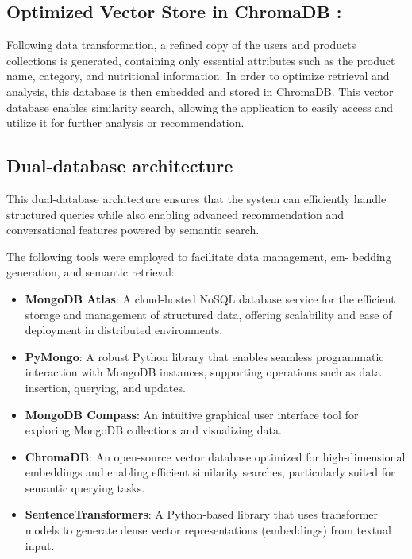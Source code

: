 \subsection{Optimized Vector Store in ChromaDB :}
Following data transformation, a refined copy of the users and products
collections is generated, containing only essential attributes such as
the product name, category, and nutritional information. In order to
optimize retrieval and analysis, this database is then embedded and
stored in ChromaDB. This vector database enables similarity search,
allowing the application to easily access and utilize it for further analysis
or recommendation.


\subsection{Dual-database architecture}
 
This dual-database architecture ensures that the system can efficiently
handle structured queries while also enabling advanced recommendation
and conversational features powered by semantic search.

\par The following tools were employed to facilitate data management, em-
bedding generation, and semantic retrieval:

\begin{itemize}[label=\textbf{-}]
    \item \textbf{MongoDB Atlas}: A cloud-hosted NoSQL database service for the efficient storage and management of structured data, offering scalability and ease of deployment in distributed environments.
    \item \textbf{PyMongo}: A robust Python library that enables seamless programmatic interaction with MongoDB instances, supporting operations such as data insertion, querying, and updates.
    \item \textbf{MongoDB Compass}: An intuitive graphical user interface tool for exploring MongoDB collections and visualizing data.
    \item \textbf{ChromaDB}: An open-source vector database optimized for high-dimensional embeddings and enabling efficient similarity searches, particularly suited for semantic querying tasks.
    \item \textbf{SentenceTransformers}: A Python-based library that uses transformer models to generate dense vector representations (embeddings) from textual input.
\end{itemize}






